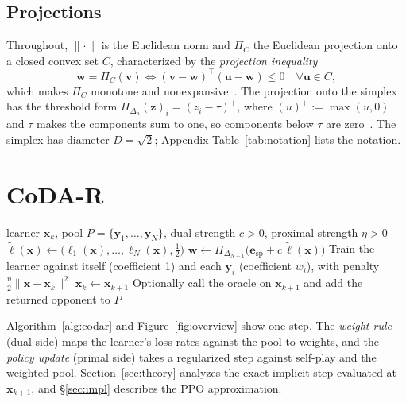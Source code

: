 \documentclass{article} %
\theoremstyle{plain}
\theoremstyle{remark}
\newcommand{\Proj}{\Pi}
\newcommand{\simplex}{\Delta}
\newcommand{\bx}{{\bm{x}}}
\newcommand{\by}{{\bm{y}}}
\newcommand{\bv}{{\bm{v}}}
\newcommand{\bw}{{\bm{w}}}
\newcommand{\bz}{{\bm{z}}}
\newcommand{\bu}{{\bm{u}}}
\newcommand{\be}{{\bm{e}}}
\newcommand{\bell}{{\bm{\ell}}}
\newcommand{\aug}{\tilde{\bell}}
\newcommand{\esp}{\be_{\mathrm{sp}}}
\newcommand{\codar}{CoDA-R}
\begin{document}
\subsection{Projections}

Throughout, $\|\cdot\|$ is the Euclidean norm and $\Proj_C$ the Euclidean projection onto a closed convex set $C$, characterized by the \emph{projection inequality}
\begin{equation}
\bw=\Proj_C(\bv)\iff(\bv-\bw)^\top(\bu-\bw)\le0\quad\forall \bu\in C ,
\label{eq:obtuse}
\end{equation}
which makes $\Proj_C$ monotone and nonexpansive~\citep{bauschke2011convex}. The projection onto the simplex has the threshold form $\Proj_{\simplex_n}(\bz)_i=(z_i-\tau)^+$, where $(u)^+:=\max(u,0)$ and $\tau$ makes the components sum to one, so components below $\tau$ are zero~\citep{duchi2008projection}. The simplex has diameter $D=\sqrt2$; Appendix Table~\ref{tab:notation} lists the notation.


\section{\codar{}}
\label{sec:alg}

\begin{algorithm}[t]
\caption{One step of exact \codar{}.}
\label{alg:codar}
\begin{algorithmic}[1]
\Require learner $\bx_k$, pool $P=\{\by_1,\dots,\by_N\}$, dual strength $c>0$, proximal strength $\eta>0$
\State $\aug(\bx)\leftarrow\big(\ell_1(\bx),\dots,\ell_N(\bx),\tfrac12\big)$ 
\State $\bw\leftarrow\Proj_{\simplex_{N+1}}\big(\esp+c\,\aug(\bx)\big)$ 
\State Train the learner against itself (coefficient 1) and each $\by_i$ (coefficient $w_i$), with penalty $\tfrac\eta2\|\bx-\bx_k\|^2$ 
\State $\bx_k\leftarrow\bx_{k+1}$ 
\State Optionally call the oracle on $\bx_{k+1}$ and add the returned opponent to $P$
\end{algorithmic}
\end{algorithm}

Algorithm~\ref{alg:codar} and Figure~\ref{fig:overview} show one step. The \emph{weight rule} (dual side) maps the learner's loss rates against the pool to weights, and the \emph{policy update} (primal side) takes a regularized step against self-play and the weighted pool. Section~\ref{sec:theory} analyzes the exact implicit step evaluated at $\bx_{k+1}$, and \S\ref{sec:impl} describes the PPO approximation.
\end{document}
